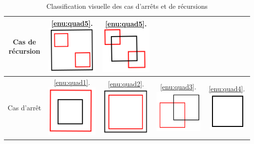 \begin{table}[htbp]
\centering
 \begin{tabular}{|c|cccc|}
  \hline
  Cas de récursion &  \ref{enu:quad5}.\includegraphics[scale=0.20]{img/QT4}&  \ref{enu:quad5}.\includegraphics[scale=0.20]{img/QT5}& &\\
  \hline
  Cas d'arrêt&  \ref{enu:quad1}.\includegraphics[scale=0.20]{img/QT1}&  \ref{enu:quad2}.\includegraphics[scale=0.20]{img/QT2}&  \ref{enu:quad3}.\includegraphics[scale=0.20]{img/QT3}&  \ref{enu:quad4}.\includegraphics[scale=0.30]{img/QT6}\\
  \hline
 \end{tabular}
 \caption{Classification visuelle des cas d'arrêts et de récursions}
\label{tab:algo}
\end{table}


